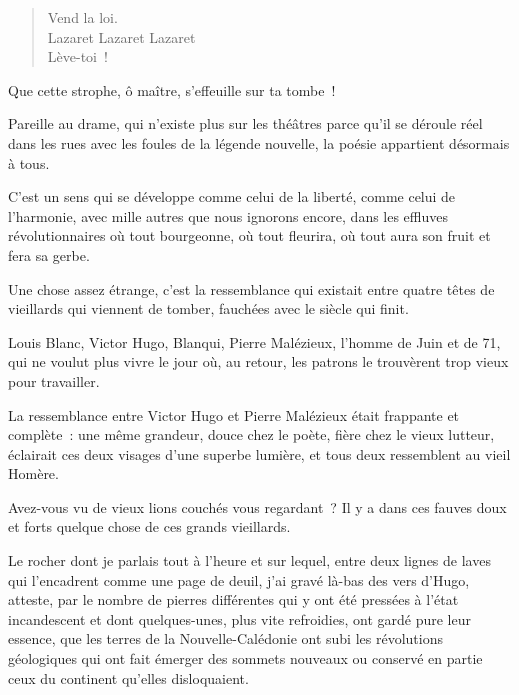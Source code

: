 \documentclass[french,twoside]{book} %
\newcommand{\signed}[1]{\bigbreak\filbreak{\raggedleft #1\par}\medskip}
\newenvironment{quoteblock}%
  {\begin{quoting}}
  {\end{quoting}}
\newenvironment{quotebar}{%
    \def\FrameCommand{{\color{rubric!10!}\vrule width 0.5em} \hspace{0.9em}}%
    \def\OuterFrameSep{\itemsep} %
    \MakeFramed {\advance\hsize-\width \FrameRestore}
  }%
  {%
    \endMakeFramed
  }
\renewenvironment{quoteblock}%
  {%
    \savenotes
    \setstretch{0.9}
    \normalfont
    \begin{quotebar}
  }
  {%
    \end{quotebar}
    \spewnotes
  }
\begin{document}
\begin{verse}
\hspace{1em}\hspace{1em}Vend la loi.\\
Lazaret Lazaret Lazaret\\
\hspace{1em}\hspace{1em}Lève-toi !\\
\end{verse}
\begin{quoteblock}


\signed{V{\scshape ictor} H{\scshape ugo}.}
\end{quoteblock}

\noindent Que cette strophe, ô maître, s’effeuille sur ta tombe !\par
Pareille au drame, qui n’existe plus sur les théâtres parce qu’il se déroule réel dans les rues avec les foules de la légende nouvelle, la poésie appartient désormais à tous.\par
C’est un sens qui se développe comme celui de la liberté, comme celui de l’harmonie, avec mille autres que nous ignorons encore, dans les effluves révolutionnaires où tout bourgeonne, où tout fleurira, où tout aura son fruit et fera sa gerbe.\par
Une chose assez étrange, c’est la ressemblance qui existait entre quatre têtes de vieillards qui viennent de tomber, fauchées avec le siècle qui finit.\par
Louis Blanc, Victor Hugo, Blanqui, Pierre Malézieux, l’homme de Juin et de 71, qui ne voulut plus vivre le jour où, au retour, les patrons le trouvèrent trop vieux pour travailler.\par
La ressemblance entre Victor Hugo et Pierre Malézieux était frappante et complète : une même  grandeur, douce chez le poète, fière chez le vieux lutteur, éclairait ces deux visages d’une superbe lumière, et tous deux ressemblent au vieil Homère.\par
Avez-vous vu de vieux lions couchés vous regardant ? Il y a dans ces fauves doux et forts quelque chose de ces grands vieillards.\par
Le rocher dont je parlais tout à l’heure et sur lequel, entre deux lignes de laves qui l’encadrent comme une page de deuil, j’ai gravé là-bas des vers d’Hugo, atteste, par le nombre de pierres différentes qui y ont été pressées à l’état incandescent et dont quelques-unes, plus vite refroidies, ont gardé pure leur essence, que les terres de la Nouvelle-Calédonie ont subi les révolutions géologiques qui ont fait émerger des sommets nouveaux ou conservé en partie ceux du continent qu’elles disloquaient.\par
\end{document}
